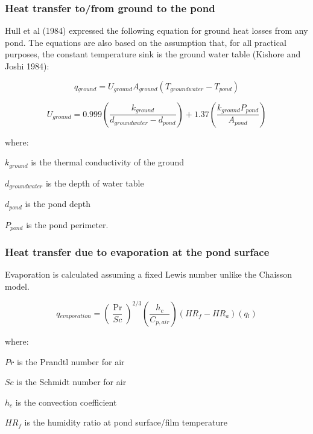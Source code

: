 \subsubsection{Heat transfer to/from ground to the pond}\label{heat-transfer-tofrom-ground-to-the-pond}

Hull et al (1984) expressed the following equation for ground heat losses from any pond. The equations are also based on the assumption that, for all practical purposes, the constant temperature sink is the ground water table (Kishore and Joshi 1984):

\begin{equation}
q{}_{ground} = U{}_{ground}A{}_{ground}(T{}_{groundwater} - T{}_{pond})
\end{equation}

\begin{equation}
U{}_{ground} = 0.999\left( {\frac{{k{}_{ground}}}{{d{}_{groundwater} - d{}_{pond}}}} \right) + 1.37\left( {\frac{{k{}_{ground}P{}_{pond}}}{{A{}_{pond}}}} \right)
\end{equation}

where:

\(k{}_{ground}\) is the thermal conductivity of the ground

\(d{}_{groundwater}\) is the depth of water table

\(d{}_{pond}\) is the pond depth

\(P{}_{pond}\) is the pond perimeter.

\subsubsection{Heat transfer due to evaporation at the pond surface}\label{heat-transfer-due-to-evaporation-at-the-pond-surface}

Evaporation is calculated assuming a fixed Lewis number unlike the Chaisson model.

\begin{equation}
q{}_{evaporation} = {\left( {\frac{{\Pr }}{{Sc}}} \right)^{2/3}}\left( {\frac{{h{}_c}}{{C{}_{p,air}}}} \right)\left( {HR{}_f - HR{}_a} \right)\left( {q{}_l} \right)
\end{equation}

where:

\(Pr\) is the Prandtl number for air

\(Sc\) is the Schmidt number for air

\(h_c\) is the convection coefficient

\(HR_f\) is the humidity ratio at pond surface/film temperature

